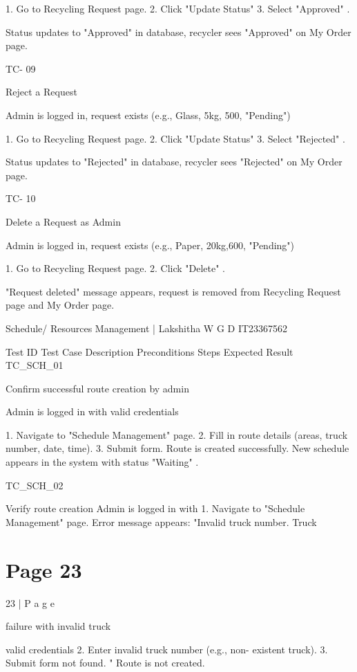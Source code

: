 \documentclass{article}
\begin{document}
1. Go to Recycling Request 
page. 
2. Click "Update Status" 
3. Select "Approved" . 
 
Status updates 
to "Approved" in 
database, 
recycler sees 
"Approved" on 
My Order page. 
 
TC-
09 
 
Reject a 
Request 
 
Admin is logged 
in, request exists 
(e.g., Glass, 5kg, 
500, "Pending") 
 
1. Go to Recycling Request 
page. 
2. Click "Update Status" 
3. Select "Rejected" . 
 
Status updates 
to "Rejected" in 
database, 
recycler sees 
"Rejected" on 
My Order page. 
 
TC-
10 
 
Delete a 
Request as 
Admin 
 
Admin is logged 
in, request exists 
(e.g., Paper, 
20kg,600, 
"Pending") 
 
1. Go to Recycling Request 
page. 
2. Click "Delete" . 
 
"Request 
deleted" 
message 
appears, request 
is removed from 
Recycling 
Request page 
and My Order 
page. 
 
Schedule/ Resources Management | Lakshitha W G D IT23367562 
 
Test ID Test Case 
Description 
Preconditions Steps Expected Result 
TC\_SCH\_01 
 
Confirm 
successful 
route 
creation by 
admin 
 
Admin is 
logged in with 
valid 
credentials 
 
1. Navigate to 
"Schedule 
Management" page. 
2. Fill in route details 
(areas, truck 
number, date, time). 
3. Submit form. 
Route is created 
successfully. New 
schedule appears 
in the system with 
status "Waiting" . 
 
TC\_SCH\_02 
 
 
Verify route 
creation 
Admin is 
logged in with 
1. Navigate to 
"Schedule 
Management" page. 
Error message 
appears: "Invalid 
truck number. Truck 

\section*{Page 23}
23 | P a g e 
 
failure with 
invalid truck 
 
valid 
credentials 
2. Enter invalid truck 
number (e.g., non-
existent truck). 3. 
Submit form 
not found. " Route is 
not created. 
 
\end{document}

